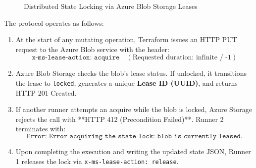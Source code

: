 \begin{figure}[htbp]
\centering
{}
\caption{Distributed State Locking via Azure Blob Storage Leases}
\label{fig:azure-blob-lease}
\end{figure}

The protocol operates as follows:
\begin{enumerate}[leftmargin=15pt]
  \item At the start of any mutating operation, Terraform issues an HTTP PUT request to the Azure Blob service with the header:
  \begin{equation*}
  \texttt{x-ms-lease-action: acquire} \quad (\text{Requested duration: infinite / -1})
  \end{equation*}
  \item Azure Blob Storage checks the blob's lease status. If unlocked, it transitions the lease to \texttt{locked}, generates a unique \textbf{Lease ID (UUID)}, and returns HTTP 201 Created.
  \item If another runner attempts an acquire while the blob is locked, Azure Storage rejects the call with **HTTP 412 (Precondition Failed)**. Runner 2 terminates with:
  \begin{equation*}
  \texttt{Error: Error acquiring the state lock: blob is currently leased.}
  \end{equation*}
  \item Upon completing the execution and writing the updated state JSON, Runner 1 releases the lock via \texttt{x-ms-lease-action: release}.
\end{enumerate}

